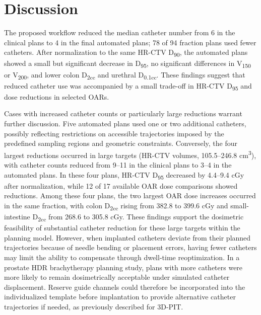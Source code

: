 \documentclass[12pt,twoside,letterpaper]{article}
\begin{document}
\begin{table}[H]
\begin{minipage}{\linewidth}
\end{minipage}
\end{table}

\section{Discussion}\label{sec:4}

The proposed workflow reduced the median catheter number from 6 in the clinical plans to 4 in the final automated plans; 78 of 94 fraction plans used fewer catheters. After normalization to the same HR-CTV D\textsubscript{90}, the automated plans showed a small but significant decrease in D\textsubscript{95}, no significant differences in V\textsubscript{150} or V\textsubscript{200}, and lower colon D\textsubscript{2cc} and urethral D\textsubscript{0.1cc}. These findings suggest that reduced catheter use was accompanied by a small trade-off in HR-CTV D\textsubscript{95} and dose reductions in selected OARs.

Cases with increased catheter counts or particularly large reductions warrant further discussion. Five automated plans used one or two additional catheters, possibly reflecting restrictions on accessible trajectories imposed by the predefined sampling regions and geometric constraints. Conversely, the four largest reductions occurred in large targets (HR-CTV volumes, 105.5--246.8 cm\textsuperscript{3}), with catheter counts reduced from 9--11 in the clinical plans to 3--4 in the automated plans. In these four plans, HR-CTV D\textsubscript{95} decreased by 4.4--9.4 cGy after normalization, while 12 of 17 available OAR dose comparisons showed reductions. Among these four plans, the two largest OAR dose increases occurred in the same fraction, with colon D\textsubscript{2cc} rising from 382.8 to 399.6 cGy and small-intestine D\textsubscript{2cc} from 268.6 to 305.8 cGy. These findings support the dosimetric feasibility of substantial catheter reduction for these large targets within the planning model. However, when implanted catheters deviate from their planned trajectories because of needle bending or placement errors,\cite{ref13} having fewer catheters may limit the ability to compensate through dwell-time reoptimization. In a prostate HDR brachytherapy planning study, plans with more catheters were more likely to remain dosimetrically acceptable under simulated catheter displacement.\cite{ref68} Reserve guide channels could therefore be incorporated into the individualized template before implantation to provide alternative catheter trajectories if needed, as previously described for 3D-PIT.\cite{ref21}
\end{document}
